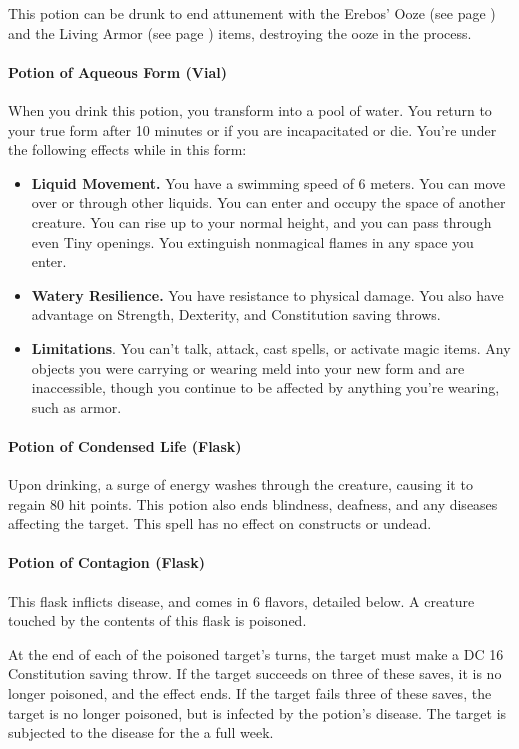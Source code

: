         This potion can be drunk to end attunement with the Erebos' Ooze (see page \pageref{item::erebosooze}) and the Living Armor (see page \pageref{item::livingarmor}) items, destroying the ooze in the process.
    \paragraph{Potion of Aqueous Form (Vial)}
        When you drink this potion, you transform into a pool of water.
        You return to your true form after 10 minutes or if you are incapacitated or die.
        You're under the following effects while in this form:
        \begin{itemize}
            \item \textbf{Liquid Movement.} You have a swimming speed of 6 meters.
            You can move over or through other liquids.
            You can enter and occupy the space of another creature.
            You can rise up to your normal height, and you can pass through even Tiny openings.
            You extinguish nonmagical flames in any space you enter.
            \item \textbf{Watery Resilience.} You have resistance to physical damage.
            You also have advantage on Strength, Dexterity, and Constitution saving throws.
            \item \textbf{Limitations}. You can't talk, attack, cast spells, or activate magic items.
            Any objects you were carrying or wearing meld into your new form and are inaccessible, though you continue to be affected by anything you're wearing, such as armor.
        \end{itemize}
    \paragraph{Potion of Condensed Life (Flask)} %
        Upon drinking, a surge of energy washes through the creature, causing it to regain 80 hit points.
        This potion also ends blindness, deafness, and any diseases affecting the target.
        This spell has no effect on constructs or undead.
    \paragraph{Potion of Contagion (Flask)} %
        This flask inflicts disease, and comes in 6 flavors, detailed below.
        A creature touched by the contents of this flask is poisoned.

        At the end of each of the poisoned target's turns, the target must make a DC 16 Constitution saving throw.
        If the target succeeds on three of these saves, it is no longer poisoned, and the effect ends.
        If the target fails three of these saves, the target is no longer poisoned, but is infected by the potion's disease.
        The target is subjected to the disease for the a full week.

